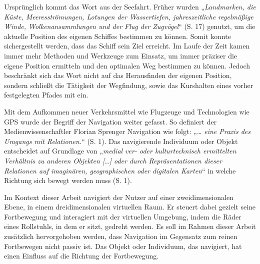 Ursprünglich kommt das Wort aus der Seefahrt.
Früher wurden „\textit{Landmarken, die Küste, Meeresströmungen, Lotungen der Wassertiefen, jahreszeitliche regelmäßige Winde, Wolkenansammlungen und der Flug der Zugvögel}“ (S. 17)\cite{wolfschmidtNavigareNecesseEst2008} genutzt, um die aktuelle Position des eigenen Schiffes bestimmen zu können.
Somit konnte sichergestellt werden, dass das Schiff sein Ziel erreicht.
Im Laufe der Zeit kamen immer mehr Methoden und Werkzeuge zum Einsatz, um immer präziser die eigene Position ermitteln und den optimalen Weg bestimmen zu können.
Jedoch beschränkt sich das Wort nicht auf das Herausfinden der eigenen Position, sondern schließt die Tätigkeit der Wegfindung, sowie das Kurshalten eines vorher festgelegten Pfades mit ein.

Mit dem Aufkommen neuer Verkehrsmittel wie Flugzeuge und Technologien wie GPS wurde der Begriff der Navigation weiter gefasst.
So definiert der Medienwissenschaftler Florian Sprenger Navigation wie folgt: „\textit{… eine Praxis des Umgangs mit Relationen.}“ (S. 1)\cite{sprengerNavigationenUndRelationen2022}.
Das navigierende Individuum oder Objekt entscheidet auf Grundlage von „\textit{medial ver- oder kulturtechnisch ermittelten Verhältnis zu anderen Objekten […] oder durch Repräsentationen dieser Relationen auf imaginären, geographischen oder digitalen Karten}“ in welche Richtung sich bewegt werden muss (S. 1)\cite{sprengerNavigationenUndRelationen2022}.

Im Kontext dieser Arbeit navigiert der Nutzer auf einer zweidimensionalen Ebene, in einem dreidimensionalen virtuellen Raum.
Er steuert dabei gezielt seine Fortbewegung und interagiert mit der virtuellen Umgebung, indem die Räder eines Rollstuhls, in dem er sitzt, gedreht werden.
Es soll im Rahmen dieser Arbeit zusätzlich hervorgehoben werden, dass Navigation im Gegensatz zum reinen Fortbewegen nicht passiv ist.
Das Objekt oder Individuum, das navigiert, hat einen Einfluss auf die Richtung der Fortbewegung.


